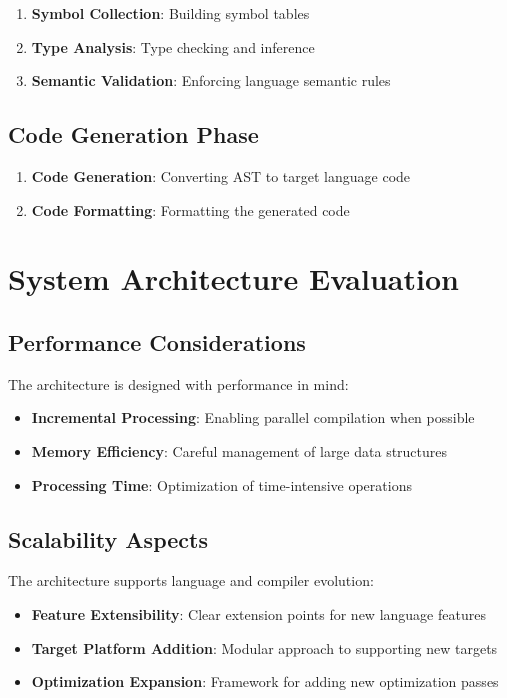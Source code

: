 \documentclass[12pt,a4paper]{article}
\begin{document}
\begin{enumerate}
    \item \textbf{Symbol Collection}: Building symbol tables
    \item \textbf{Type Analysis}: Type checking and inference
    \item \textbf{Semantic Validation}: Enforcing language semantic rules
\end{enumerate}

\subsection{Code Generation Phase}

\begin{enumerate}
    \item \textbf{Code Generation}: Converting AST to target language code
    \item \textbf{Code Formatting}: Formatting the generated code
\end{enumerate}

\section{System Architecture Evaluation}

\subsection{Performance Considerations}

The architecture is designed with performance in mind:

\begin{itemize}
    \item \textbf{Incremental Processing}: Enabling parallel compilation when possible
    \item \textbf{Memory Efficiency}: Careful management of large data structures
    \item \textbf{Processing Time}: Optimization of time-intensive operations
\end{itemize}

\subsection{Scalability Aspects}

The architecture supports language and compiler evolution:

\begin{itemize}
    \item \textbf{Feature Extensibility}: Clear extension points for new language features
    \item \textbf{Target Platform Addition}: Modular approach to supporting new targets
    \item \textbf{Optimization Expansion}: Framework for adding new optimization passes
\end{itemize}
\end{document}
